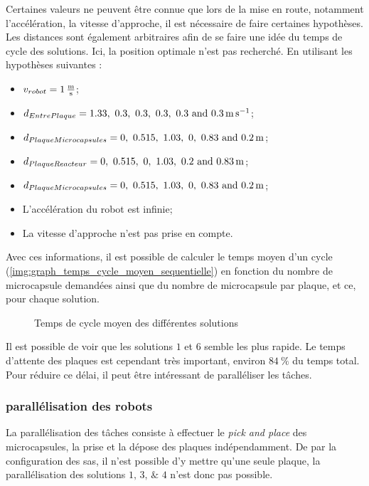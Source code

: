 Certaines valeurs ne peuvent être connue que lors de la mise en route, notamment l'accélération, la vitesse d'approche, il est nécessaire de faire certaines hypothèses. Les distances sont également arbitraires afin de se faire une idée du temps de cycle des solutions. Ici, la position optimale n'est pas recherché.
En utilisant les hypothèses suivantes :
\begin{itemize}
    \item $v_{robot} = \qty{1}{\frac{\m}{\s}}$;
    \item $d_{EntrePlaque} = \qtylist[list-units = single]{1.33; 0.3; 0.3; 0.3; 0.3; 0.3}{\m\per\s}$;
    \item $d_{PlaqueMicrocapsules} = \qtylist[list-units = single]{0; 0.515; 1.03; 0; 0.83; 0.2 }{\m}$;
    \item $d_{PlaqueReacteur} =      \qtylist[list-units = single]{0; 0.515; 0; 1.03; 0.2; 0.83 }{\m}$;
    \item $d_{PlaqueMicrocapsules} = \qtylist[list-units = single]{0; 0.515; 1.03; 0; 0.83; 0.2 }{\m}$;
    \item L'accélération du robot est infinie;
    \item La vitesse d'approche n'est pas prise en compte.
\end{itemize}
Avec ces informations, il est possible de calculer le temps moyen d'un cycle (\cf \autoref{img:graph_temps_cycle_moyen_sequentielle}) en fonction du nombre de microcapsule demandées ainsi que du nombre de microcapsule par plaque, et ce, pour chaque solution.
\begin{figure}[H]
    \centering
    
    \caption{Temps de cycle moyen des différentes solutions}
    \label{img:graph_temps_cycle_moyen_sequentielle}
\end{figure}
Il est possible de voir que les solutions $1$ et $6$ semble les plus rapide. Le temps d'attente des plaques est cependant très important, environ $84~\%$ du temps total. Pour réduire ce délai, il peut être intéressant de paralléliser les tâches.
\subsubsection{parallélisation des robots}
La parallélisation des tâches consiste à effectuer le \textit{pick and place} des microcapsules, la prise et la dépose des plaques indépendamment.
De par la configuration des sas, il n'est possible d'y mettre qu'une seule plaque, la parallélisation des solutions $\numlist{1; 3; 4}$ n'est donc pas possible.

